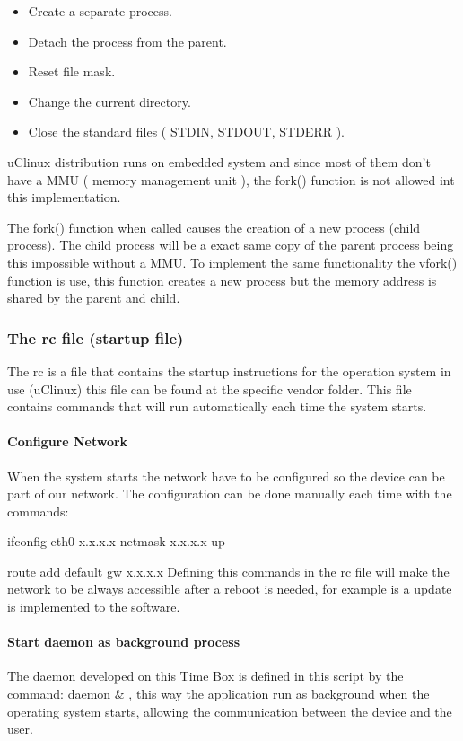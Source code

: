 \begin{itemize}
	\item Create a separate process.
	\item Detach the process from the parent.
	\item Reset file mask.
	\item Change the current directory.
	\item Close the standard files ( STDIN, STDOUT, STDERR ).
\end{itemize}

uClinux distribution runs on embedded system and since most of them don't have a MMU ( memory management unit ), the fork() function is not allowed int this implementation.

The fork() function when called causes the creation of a new process (child process). The child process will be a exact same copy of the parent process being this impossible without a MMU.
To implement the same functionality the vfork() function is use, this function creates a new process but the memory address is shared by the parent and child.

\subsubsection{The rc file (startup file)}
The rc is a file that contains the startup instructions for the operation system in use (uClinux) this file can be found at the specific vendor folder. 
This file contains commands that will run automatically each time the system starts.
\paragraph{Configure Network}
When the system starts the network have to be configured so the device can be part of our network. The configuration can be done manually each time with the commands:

ifconfig eth0 x.x.x.x netmask x.x.x.x up

route add default gw x.x.x.x
\newline
\newline
Defining this commands in the rc file will make the network to be always accessible after a reboot is needed, for example is a update is implemented to the software. 

\paragraph{Start daemon as background process}
The daemon developed on this Time Box is defined in this script by the command: daemon \& , this way the application run as background when the operating system starts, allowing the communication between the device and the user.

